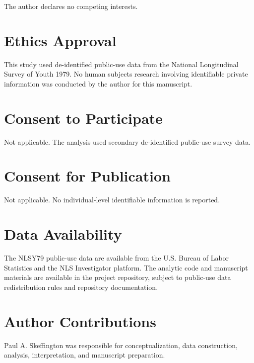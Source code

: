 \documentclass[12pt]{article}
\begin{document}
The author declares no competing interests.

\section*{Ethics Approval}

This study used de-identified public-use data from the National Longitudinal Survey of Youth 1979. No human subjects research involving identifiable private information was conducted by the author for this manuscript.

\section*{Consent to Participate}

Not applicable. The analysis used secondary de-identified public-use survey data.

\section*{Consent for Publication}

Not applicable. No individual-level identifiable information is reported.

\section*{Data Availability}

The NLSY79 public-use data are available from the U.S. Bureau of Labor Statistics and the NLS Investigator platform. The analytic code and manuscript materials are available in the project repository, subject to public-use data redistribution rules and repository documentation.

\section*{Author Contributions}

Paul A. Skeffington was responsible for conceptualization, data construction, analysis, interpretation, and manuscript preparation.
\end{document}
